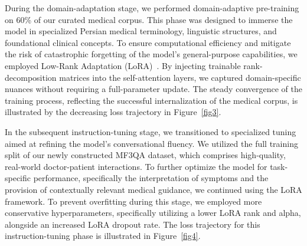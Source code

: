 \documentclass[review]{elsarticle}
\begin{document}
During the domain-adaptation stage, we performed domain-adaptive pre-training on 60\% of our curated medical corpus. This phase was designed to immerse the model in specialized Persian medical terminology, linguistic structures, and foundational clinical concepts. To ensure computational efficiency and mitigate the risk of catastrophic forgetting of the model’s general-purpose capabilities, we employed Low-Rank Adaptation (LoRA)~\cite{b29}. By injecting trainable rank-decomposition matrices into the self-attention layers, we captured domain-specific nuances without requiring a full-parameter update. The steady convergence of the training process, reflecting the successful internalization of the medical corpus, is illustrated by the decreasing loss trajectory in Figure~\ref{fig3}.

In the subsequent instruction-tuning stage, we transitioned to specialized tuning aimed at refining the model’s conversational fluency. We utilized the full training split of our newly constructed MF3QA dataset, which comprises high-quality, real-world doctor-patient interactions. To further optimize the model for task-specific performance, specifically the interpretation of symptoms and the provision of contextually relevant medical guidance, we continued using the LoRA framework. To prevent overfitting during this stage, we employed more conservative hyperparameters, specifically utilizing a lower LoRA rank and alpha, alongside an increased LoRA dropout rate. The loss trajectory for this instruction-tuning phase is illustrated in Figure~\ref{fig4}.
\end{document}
